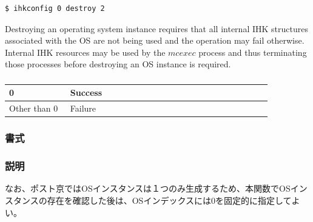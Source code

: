 \documentclass[twoside,11pt,fleqn]{book}
\newenvironment{myverbt}
  {\VerbatimEnvironment
   \par\VerbX}
  {\endVerbX }
\begin{document}
\begin{verbatim}
$ ihkconfig 0 destroy 2
\end{verbatim}

Destroying an operating system instance requires that all internal IHK
structures associated with the OS are not being used and the operation
may fail otherwise. Internal IHK resources may be used by the $mcexec$
process and thus terminating those processes before destroying an OS
instance is required.

\subsubsection*{}
\begin{table}[!h]
\footnotesize
\begin{tabular}{|p{0.20\linewidth}|p{0.66\linewidth}|} \hline
0&Success\\ \hline
Other than 0&Failure\\ \hline
\end{tabular}
\vspace{-0em}
\end{table}
\FloatBarrier

\subsubsection{}

\subsubsection*{書式}{\quad} 
\subsubsection*{説明}{\quad} 
\begin{myverbt}[commandchars=\\\{\}]
\end{myverbt}
なお、ポスト京ではOSインスタンスは１つのみ生成するため、本関数でOSインスタンスの存在を確認した後は、OSインデックスには0を固定的に指定してよい。
\end{document}
